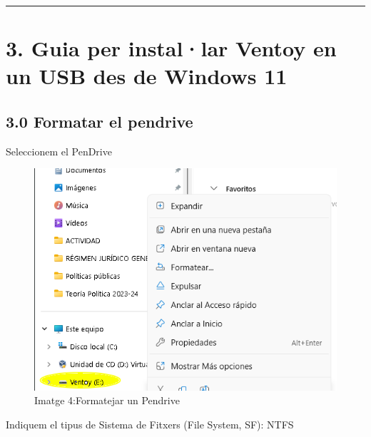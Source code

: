 \documentclass[
  12 pt,
  a4paper,
]{article}
\begin{document}
\begin{center}\rule{0.5\linewidth}{0.5pt}\end{center}

\newpage

\section{3. Guia per instal·lar Ventoy en un USB des de Windows
11}\label{guia-per-installar-ventoy-en-un-usb-des-de-windows-11}

\subsection{3.0 Formatar el pendrive}\label{formatar-el-pendrive}

Seleccionem el PenDrive

\begin{figure}
\centering
\includegraphics{png/formatWindows.png}
\caption{Imatge 4:Formatejar un Pendrive}
\end{figure}

Indiquem el tipus de Sistema de Fitxers (File System, SF): NTFS
\end{document}
